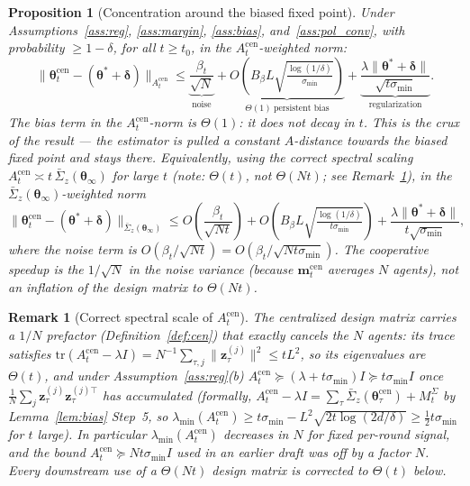 \documentclass[11pt]{article}
\newtheorem{proposition}[theorem]{Proposition}
\newtheorem*{remark}{Remark}
\begin{document}
\begin{proposition}[Concentration around the biased fixed point]
\label{prop:conc}
Under Assumptions~\ref{ass:reg}, \ref{ass:margin}, \ref{ass:bias},
and~\ref{ass:pol_conv}, with probability $\geq 1-\delta$,
for all $t\geq t_0$, in the $A_t^{\mathrm{cen}}$-weighted norm:
\begin{equation}
\|\bm{\theta}_t^{\mathrm{cen}}-(\bm{\theta}^{\!*}+\bm{\delta})\|_{A_t^{\mathrm{cen}}}
\leq\underbrace{\frac{\beta_t}{\sqrt{N}}}_{\text{noise}}
+\underbrace{O\!\left(B_\beta L\sqrt{\tfrac{\log(1/\delta)}{\sigma_{\min}}}\right)}_{\Theta(1)\ \text{persistent bias}}
+\underbrace{\frac{\lambda\|\bm{\theta}^{\!*}+\bm{\delta}\|}{\sqrt{t\sigma_{\min}}}}_{\text{regularization}}.
\label{eq:conc}
\end{equation}
The bias term in the $A_t^{\mathrm{cen}}$-norm is $\Theta(1)$: it
does \emph{not} decay in $t$.  This is the crux of the result --- the
estimator is pulled a constant $A$-distance towards the biased fixed
point and stays there.
Equivalently, using the correct spectral scaling
$A_t^{\mathrm{cen}}\asymp t\,\bar{\Sigma}_z(\bm{\theta}_\infty)$ for large
$t$ (note: $\Theta(t)$, \emph{not} $\Theta(Nt)$; see
Remark~\ref{rem:spectral}), in the
$\bar{\Sigma}_z(\bm{\theta}_\infty)$-weighted norm
\begin{equation}
\|\bm{\theta}_t^{\mathrm{cen}}-(\bm{\theta}^{\!*}+\bm{\delta})\|_{\bar{\Sigma}_z(\bm{\theta}_\infty)}
\leq O\!\left(\frac{\beta_t}{\sqrt{N t}}\right)
+O\!\left(B_\beta L\sqrt{\tfrac{\log(1/\delta)}{t\sigma_{\min}}}\right)
+\frac{\lambda\|\bm{\theta}^{\!*}+\bm{\delta}\|}{t\sqrt{\sigma_{\min}}},
\label{eq:conc_sigma}
\end{equation}
where the noise term is $O(\beta_t/\sqrt{Nt})=O(\beta_t/\sqrt{Nt\sigma_{\min}})$.
The cooperative speedup is the $1/\sqrt N$ in the noise
\emph{variance} (because $\bm{m}_t^{\mathrm{cen}}$ averages $N$ agents),
\emph{not} an inflation of the design matrix to $\Theta(Nt)$.
\end{proposition}

\begin{remark}[Correct spectral scale of $A_t^{\mathrm{cen}}$]\label{rem:spectral}
The centralized design matrix carries a $1/N$ prefactor
(Definition~\ref{def:cen}) that exactly cancels the $N$ agents: its
trace satisfies
$\mathrm{tr}(A_t^{\mathrm{cen}}-\lambda I)
=N^{-1}\sum_{\tau,j}\|\bm{z}_\tau^{(j)}\|^2\leq tL^2$, so its eigenvalues
are $\Theta(t)$, and under Assumption~\ref{ass:reg}(b)
$A_t^{\mathrm{cen}}\succeq(\lambda+t\sigma_{\min})I\succeq t\sigma_{\min}I$
once $\frac1N\sum_j\bm{z}_\tau^{(j)}\bm{z}_\tau^{(j)\top}$ has accumulated
(formally, $A_t^{\mathrm{cen}}-\lambda I=\sum_{\tau}\bar{\Sigma}_z(\bm{\theta}_\tau^{\mathrm{cen}})+M_t^\Sigma$
by Lemma~\ref{lem:bias} Step~5, so $\lambda_{\min}(A_t^{\mathrm{cen}})\geq
t\sigma_{\min}-L^2\sqrt{2t\log(2d/\delta)}\geq\tfrac12 t\sigma_{\min}$ for
$t$ large).  In particular $\lambda_{\min}(A_t^{\mathrm{cen}})$
\emph{decreases} in $N$ for fixed per-round signal, and the bound
$A_t^{\mathrm{cen}}\succeq Nt\sigma_{\min}I$ used in an earlier draft was
off by a factor $N$.  Every downstream use of a $\Theta(Nt)$ design
matrix is corrected to $\Theta(t)$ below.
\end{remark}
\end{document}
